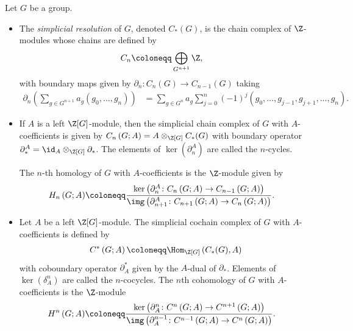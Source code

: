 \documentclass[10pt]{mypackage}
\renewcommand{\coloneq}{\coloneqq}
\begin{document}
\begin{definition}
  Let $G$ be a group.
  \begin{itemize}
    \item The \textit{simplicial resolution} of $G$, denoted $C_{\ast}(G)$, is the chain complex of $\Z$-modules whose chains are defined by
      \begin{align*}
        C_n &\coloneq \bigoplus_{G^{n+1}} \Z,
      \end{align*}
      with boundary maps given by $\partial_n\colon C_n(G)\rightarrow C_{n-1}(G)$ taking
      \begin{align*}
        \partial_n\left( \sum_{g\in G^{n+1}}a_g \left( g_0,\dots,g_n \right) \right) &= \sum_{g\in G^n} a_g\sum_{j=0}^{n} \left( -1 \right)^{j} \left( g_0,\dots,g_{j-1},g_{j+1},\dots,g_n \right).
      \end{align*}
    \item If $A$ is a left $\Z[G]$-module, then the simplicial chain complex of $G$ with $A$-coefficients is given by $C_n\left( G;A \right) = A\otimes_{\Z[G]}C_{\ast}(G)$ with boundary operator $\partial_{\ast}^A = \id_A\otimes_{\Z[G]}\partial_{\ast}$. The elements of $\ker\left( \partial_n^A \right)$ are called the $n$-cycles.

      The $n$-th homology of $G$ with $A$-coefficients is the $\Z$-module given by
      \begin{align*}
        H_n\left( G;A \right) &\coloneq \frac{\ker\left( \partial_n^A\colon C_n\left( G;A \right)\rightarrow C_{n-1}\left( G;A \right) \right)}{\img\left( \partial_{n+1}^{A}\colon C_{n+1}\left( G;A \right)\rightarrow C_n\left( G;A \right) \right)}.
      \end{align*}
    \item Let $A$ be a left $\Z[G]$-module. The simplicial cochain complex of $G$ with $A$-coefficients is defined by
      \begin{align*}
        C^{\ast}\left( G;A \right) \coloneq \Hom_{\Z[G]} \left( C_{\ast}(G),A \right)
      \end{align*}
      with coboundary operator $\partial_A^{\ast}$ given by the $A$-dual of $\partial_{\ast}$. Elements of $\ker\left( \delta_A^n \right)$ are called the $n$-cocycles. The $n$th cohomology of $G$ with $A$-coefficients is the $\Z$-module
      \begin{align*}
        H^n\left( G;A \right) &\coloneq \frac{\ker\left( \partial^n_A\colon C^n\left( G;A \right)\rightarrow C^{n+1}\left( G;A \right) \right)}{\img\left( \partial^{n-1}_A\colon C^{n-1}\left( G;A \right)\rightarrow C^n\left( G;A \right) \right)}.
      \end{align*}
  \end{itemize}
\end{definition}
\end{document}
